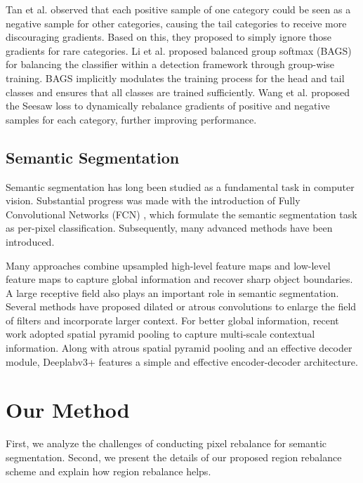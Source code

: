 \documentclass[final]{cvpr}
\begin{document}
Tan et al. \cite{tan2020eql} observed that each positive sample of one category could be seen as a negative sample for other categories, causing the tail categories to receive more discouraging gradients. Based on this, they proposed to simply ignore those gradients for rare categories. 
Li et al. \cite{li2020overcoming} proposed balanced group softmax (BAGS) for balancing the classifier within a detection framework through group-wise training. BAGS implicitly modulates the training process for the head and tail classes and ensures that all classes are trained sufficiently. Wang et al. \cite{wang2021seesaw} proposed the Seesaw loss to dynamically rebalance gradients of positive and negative samples for each category, further improving performance.


\subsection{Semantic Segmentation}
Semantic segmentation has long been studied as a fundamental task in computer vision. Substantial progress was made with the introduction of Fully Convolutional Networks (FCN) \cite{long2015fully}, which formulate the semantic segmentation task as per-pixel classification. Subsequently, many advanced methods have been introduced.


Many approaches \cite{amirul2017gated,badrinarayanan2017segnet,lin2017refinenet, pohlen2017full, ronneberger2015u} combine upsampled high-level feature maps and low-level feature maps to capture global information and recover sharp object boundaries. A large receptive field also plays an important role in semantic segmentation. Several methods \cite{chen2017deeplab,chen2014semantic,yu2015multi} have proposed dilated or atrous convolutions to enlarge the field of filters and incorporate larger context. For better global information, recent work \cite{chen2017rethinking, chen2018encoder, DBLP:conf/cvpr/ZhaoSQWJ17} adopted spatial pyramid pooling to capture multi-scale contextual information. Along with atrous spatial pyramid pooling and an effective decoder module, Deeplabv$3$+ \cite{chen2018encoder} features a simple and effective encoder-decoder architecture.


\section{Our Method}
First, we analyze the challenges of conducting pixel rebalance for semantic segmentation.
Second, we present the details of our proposed region rebalance scheme and explain how region rebalance helps.
\end{document}
